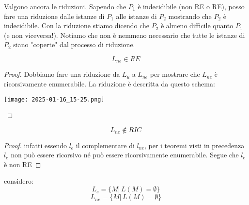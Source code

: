 	Valgono ancora le riduzioni. Sapendo che $P_1$ è indecidibile (non RE o RE), posso fare una riduzione
	dalle istanze di $P_1$  alle istanze di $P_2$ mostrando che $P_2$ è indecidibile.
	Con la riduzione stiamo dicendo che $P_2$ è almeno difficile quanto $P_1$  (e non viceversa!).
	Notiamo che non è nemmeno necessario che tutte le istanze di $P_2$  siano "coperte" dal processo di
riduzione.
\begin{theorem}
	$$L_{ne}\in RE$$
\end{theorem}
\begin{proof}
	Dobbiamo fare una riduzione da $L_u$ a $L_{ne}$ per mostrare che $L_{ne}$ è ricorsivamente enumerabile.
	La riduzione è descritta da questo schema:
	\begin{center}
			\texttt{[image: 2025-01-16\_15-25.png]}
	\end{center}
\end{proof}
\begin{theorem}
	$$L_{ne}\not\in RIC$$
\end{theorem}
\begin{proof}
	infatti essendo $l_e$ il complementare di $l_{ne}$, per i teoremi visti in precedenza  $l_e$ non può essere ricorsivo
	né può essere ricorsivamente enumerabile. Segue che  $l_e$ è non RE
\end{proof}
\begin{example}
	considero:
	$$L_e=\{M|\,L(M)=\emptyset\}$$
	$$L_{ne}=\{M|\,L(M)=\emptyset\}$$
\end{example}
